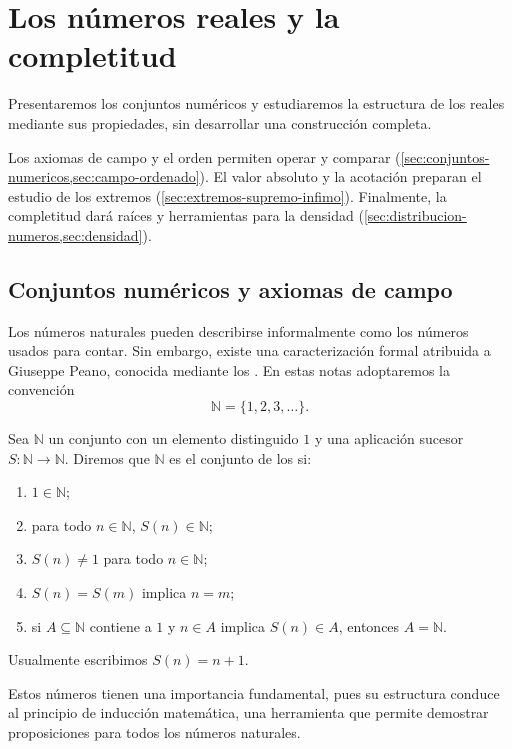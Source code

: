 \chapter{Los números reales y la completitud}
\label{cap:reales-completitud}
Presentaremos los conjuntos numéricos y estudiaremos la estructura de los reales mediante sus propiedades, sin desarrollar una construcción completa.

Los axiomas de campo y el orden permiten operar y comparar (\cref{sec:conjuntos-numericos,sec:campo-ordenado}). El valor absoluto y la acotación preparan el estudio de los extremos (\cref{sec:extremos-supremo-infimo}). Finalmente, la completitud dará raíces y herramientas para la densidad (\cref{sec:distribucion-numeros,sec:densidad}).

\section{Conjuntos numéricos y axiomas de campo}
\label{sec:conjuntos-numericos}

Los números naturales pueden describirse informalmente como los números usados para contar. Sin embargo, existe una caracterización formal atribuida a Giuseppe Peano, conocida mediante los . En estas notas adoptaremos la convención
\[
\mathbb{N}=\{1,2,3,\ldots\}.
\]

\begin{samepage}
\begin{definition}
\label{def:naturales}
Sea $\mathbb{N}$ un conjunto con un elemento distinguido $1$ y una aplicación sucesor
$S:\mathbb{N}\to\mathbb{N}.$ Diremos que $\mathbb{N}$ es el conjunto de los  si:
\begin{enumerate}
    \item $1\in\mathbb{N}$;
    \item para todo $n\in\mathbb{N}$, $S(n)\in\mathbb{N}$;
    \item $S(n)\neq 1$ para todo $n\in\mathbb{N}$;
    \item $S(n)=S(m)$ implica $n=m$;
    \item si $A\subseteq\mathbb{N}$ contiene a $1$ y $n\in A$ implica $S(n)\in A$, entonces $A=\mathbb{N}$.
\end{enumerate}
Usualmente escribimos $S(n)=n+1$.
\end{definition}
\end{samepage}

Estos números tienen una importancia fundamental, pues su estructura conduce al principio de inducción matemática, una herramienta que permite demostrar proposiciones para todos los números naturales.

